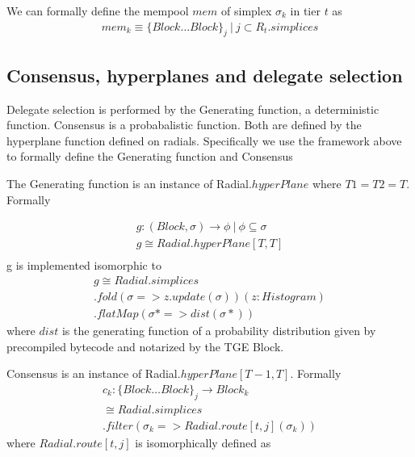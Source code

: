 \documentclass{article}
\begin{document}
We can formally define the mempool $mem$ of simplex $\sigma_k$ in tier $t$ as 
\begin{equation} \label{eq1}
\begin{split}
mem_k \equiv \{Block \dots Block\}_j \ | \ j \subset R_t.simplices
\end{split}
\end{equation}

\subsection{Consensus, hyperplanes and delegate selection}
Delegate selection is performed by the Generating function, a deterministic function. Consensus is a probabalistic function. Both are defined by the hyperplane function defined on radials. Specifically we use the framework above to formally define the Generating function and Consensus

The Generating function is an instance of  Radial.$hyperPlane$ where $T1 = T2 = T$. Formally 

\begin{equation} \label{eq1}
\begin{split}
g: (Block, \sigma) \rightarrow \phi \ | \ \phi \subseteq \sigma \\
g \cong Radial.hyperPlane[T,T] \\
\end{split}
\end{equation}
g is implemented isomorphic to 
\begin{equation} \label{eq1}
\begin{split}
g \cong Radial.simplices \\
.fold(\sigma => z.update(\sigma))(z: Histogram) \\
.flatMap(\sigma* => dist(\sigma*))
\end{split}
\end{equation}
where $dist$ is the generating function of a probability distribution given by precompiled bytecode and notarized by the TGE Block.

Consensus is an instance of Radial.$hyperPlane[T-1, T]$. Formally 
\begin{equation} \label{eq1}
\begin{split}
c_k: \{Block \dots Block\}_j \rightarrow Block_k \\
\cong Radial.simplices \\
.filter(\sigma_k => Radial.route[t,j](\sigma_k))
\end{split}
\end{equation}
where $Radial.route[t,j]$ is isomorphically defined as
\end{document}

